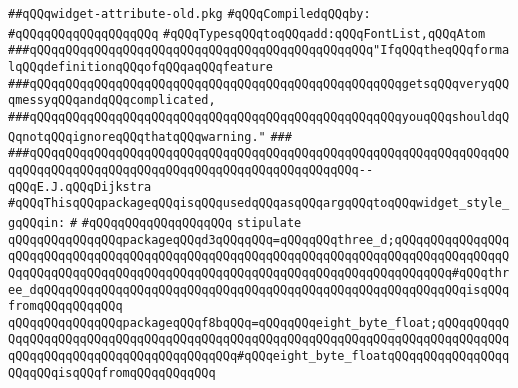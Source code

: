 \label{src/lib/x-kit/widget/old/lib/widget-attribute-old.pkg}
\verb|##qQQqwidget-attribute-old.pkg|\newline
\newline
\verb|#qQQqCompiledqQQqby:|\newline
\verb|#qQQqqQQqqQQqqQQqqQQq|\newline
\newline
\newline
\newline
\verb|#qQQqTypesqQQqtoqQQqadd:qQQqFontList,qQQqAtom|\newline
\newline
\newline
\newline
\verb|###qQQqqQQqqQQqqQQqqQQqqQQqqQQqqQQqqQQqqQQqqQQqqQQq"IfqQQqtheqQQqformalqQQqdefinitionqQQqofqQQqaqQQqfeature|\newline
\verb|###qQQqqQQqqQQqqQQqqQQqqQQqqQQqqQQqqQQqqQQqqQQqqQQqqQQqgetsqQQqveryqQQqmessyqQQqandqQQqcomplicated,|\newline
\verb|###qQQqqQQqqQQqqQQqqQQqqQQqqQQqqQQqqQQqqQQqqQQqqQQqqQQqyouqQQqshouldqQQqnotqQQqignoreqQQqthatqQQqwarning."|\newline
\verb|###|\newline
\verb|###qQQqqQQqqQQqqQQqqQQqqQQqqQQqqQQqqQQqqQQqqQQqqQQqqQQqqQQqqQQqqQQqqQQqqQQqqQQqqQQqqQQqqQQqqQQqqQQqqQQqqQQqqQQqqQQqqQQq--qQQqE.J.qQQqDijkstra|\newline
\newline
\verb|#qQQqThisqQQqpackageqQQqisqQQqusedqQQqasqQQqargqQQqtoqQQqwidget_style_gqQQqin:|\newline
\verb|#|\newline
\verb|#qQQqqQQqqQQqqQQqqQQq|\newline
\newline
\verb|stipulate|\newline
\verb|qQQqqQQqqQQqqQQqpackageqQQqd3qQQqqQQq=qQQqqQQqthree_d;qQQqqQQqqQQqqQQqqQQqqQQqqQQqqQQqqQQqqQQqqQQqqQQqqQQqqQQqqQQqqQQqqQQqqQQqqQQqqQQqqQQqqQQqqQQqqQQqqQQqqQQqqQQqqQQqqQQqqQQqqQQqqQQqqQQqqQQqqQQqqQQqqQQq#qQQqthree_dqQQqqQQqqQQqqQQqqQQqqQQqqQQqqQQqqQQqqQQqqQQqqQQqqQQqqQQqqQQqisqQQqfromqQQqqQQqqQQq|\newline
\verb|qQQqqQQqqQQqqQQqpackageqQQqf8bqQQq=qQQqqQQqeight_byte_float;qQQqqQQqqQQqqQQqqQQqqQQqqQQqqQQqqQQqqQQqqQQqqQQqqQQqqQQqqQQqqQQqqQQqqQQqqQQqqQQqqQQqqQQqqQQqqQQqqQQqqQQqqQQqqQQq#qQQqeight_byte_floatqQQqqQQqqQQqqQQqqQQqqQQqisqQQqfromqQQqqQQqqQQq|\newline
